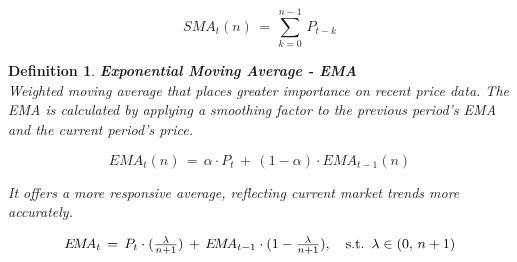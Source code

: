 \documentclass[12pt]{article}
\theoremstyle{plain}
\newtheorem*{definition}{Definition}
\begin{document}
\vspace{-15pt}

$$ S\!M\!A_t(n) \, = \, \sum_{k = 0}^{n-1} \, P_{t - k} $$

\begin{definition} \textbf{Exponential Moving Average - EMA} \\
Weighted moving average that places greater importance on recent price data. The EMA is calculated by applying a smoothing factor to the previous period's EMA and the current period's price.
\end{definition}

\vspace{-10pt}

$$ 
E\!M\!A_t(n) \, = \, \alpha \cdot P_t \, + \, (1 - \alpha) \cdot E\!M\!A_{t-1}(n)
$$

\textit{It offers a more responsive average, reflecting current market trends more accurately.}

\vspace{-15pt}

$$
E\!M\!A_t \, = \, P_t \cdot ( \scalebox{1}{$\frac{\lambda}{n + 1}$}) \, + \, E\!M\!A_{t - 1} \cdot (\scalebox{1}{$1 - \frac{\lambda}{n + 1}$}), \quad \text{s.t.} \,\,\, \lambda \in (0, \, {n + 1}) 
$$
\end{document}
